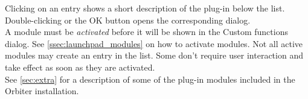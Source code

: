 \documentclass[Orbiter User Manual.tex]{subfiles}
\begin{document}
\begin{figure}[H]
	\centering
\end{figure}

\noindent
Clicking on an entry shows a short description of the plug-in below the list. Double-clicking or the OK button opens the corresponding dialog.\\
A module must be \textit{activated} before it will be shown in the Custom functions dialog. See \ref{ssec:launchpad_modules} on how to activate modules. Not all active modules may create an entry in the list. Some don't require user interaction and take effect as soon as they are activated.\\
See \ref{sec:extra} for a description of some of the plug-in modules included in the Orbiter installation.
\end{document}
